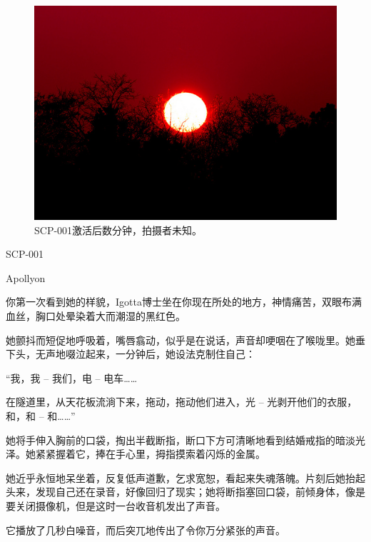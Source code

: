 \hr


\hr


\begin{figure}[H]
	\centering
	\includegraphics[width=0.5\linewidth]{images/SCP.001.when.night.breaks.jpg}
	\caption*{SCP-001激活后数分钟，拍摄者未知。}
\end{figure}

SCP-001

Apollyon




\begin{scpbox}

你第一次看到她的样貌，Igotta博士坐在你现在所处的地方，神情痛苦，双眼布满血丝，胸口处晕染着大而潮湿的黑红色。

她颤抖而短促地呼吸着，嘴唇翕动，似乎是在说话，声音却哽咽在了喉咙里。她垂下头，无声地啜泣起来，一分钟后，她设法克制住自己：

\end{scpbox}

\begin{scpdialog}

“我，我 – 我们，电 – 电车……

在隧道里，从天花板流淌下来，拖动，拖动他们进入，光 – 光剥开他们的衣服，和，和 – 和……”

\end{scpdialog}

\begin{scpbox}

她将手伸入胸前的口袋，掏出半截断指，断口下方可清晰地看到结婚戒指的暗淡光泽。她紧紧握着它，捧在手心里，拇指摸索着闪烁的金属。

她近乎永恒地呆坐着，反复低声道歉，乞求宽恕，看起来失魂落魄。片刻后她抬起头来，发现自己还在录音，好像回归了现实；她将断指塞回口袋，前倾身体，像是要关闭摄像机，但是这时一台收音机发出了声音。

它播放了几秒白噪音，而后突兀地传出了令你万分紧张的声音。

\end{scpbox}

